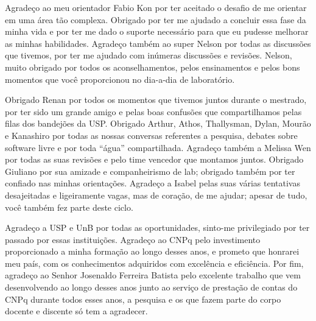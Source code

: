 Agradeço ao meu orientador Fabio Kon por ter aceitado o desafio de me orientar
em uma área tão complexa. Obrigado por ter me ajudado a concluir essa fase da
minha vida e por ter me dado o suporte necessário para que eu pudesse melhorar
as minhas habilidades. Agradeço também ao super Nelson por todas as discussões
que tivemos, por ter me ajudado com inúmeras discussões e revisões. Nelson,
muito obrigado por todos os aconselhamentos, pelos ensinamentos e pelos bons
momentos que você proporcionou no dia-a-dia de laboratório.

Obrigado Renan por todos os momentos que tivemos juntos durante o mestrado, por
ter sido um grande amigo e pelas boas confusões que compartilhamos pelas filas
dos bandejões da USP. Obrigado Arthur, Athos, Thallysman, Dylan, Mourão e
Kanashiro por todas as nossas conversas referentes a pesquisa, debates sobre
software livre e por toda “água” compartilhada. Agradeço também a Melissa Wen
por todas as suas revisões e pelo time vencedor que montamos juntos. Obrigado
Giuliano por sua amizade e companheirismo de lab; obrigado também por ter
confiado nas minhas orientações. Agradeço a Isabel pelas suas várias tentativas
desajeitadas e ligeiramente vagas, mas de coração, de me ajudar; apesar de
tudo, você também fez parte deste ciclo.

Agradeço a USP e UnB por todas as oportunidades, sinto-me privilegiado por ter
passado por essas instituições. Agradeço ao CNPq pelo investimento
proporcionado a minha formação ao longo desses anos, e prometo  que honrarei
meu país, com os conhecimentos adquiridos com excelência e eficiência.  Por
fim, agradeço ao Senhor Josenaldo Ferreira Batista pelo excelente trabalho que
vem desenvolvendo ao longo desses anos junto ao serviço de prestação de contas
do CNPq durante todos esses anos,  a pesquisa e os que fazem parte do corpo
docente e discente só tem a agradecer.

